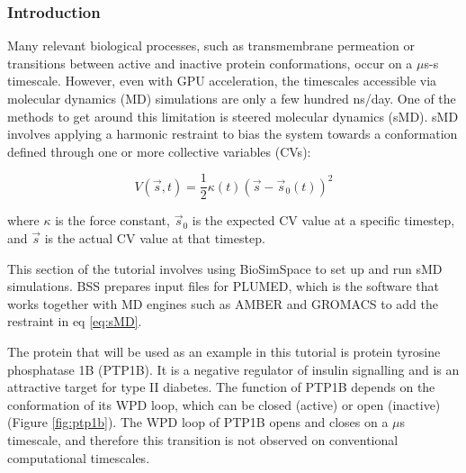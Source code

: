 \subsubsection{Introduction}
Many relevant biological processes, such as transmembrane permeation or transitions between active and inactive protein conformations, occur on a $\mu$s-s timescale\cite{Zwier2010,Choy2017,Wells2007}. However, even with GPU acceleration, the timescales accessible via molecular dynamics (MD) simulations are only a few hundred ns/day\cite{HecBioSim_benchmark}. One of the methods to get around this limitation is steered molecular dynamics (sMD). sMD involves applying a harmonic restraint to bias the system towards a conformation defined through one or more collective variables (CVs):

\begin{equation}
V(\vec{s},t) = \frac{1}{2} \kappa(t) ( \vec{s} - \vec{s}_0(t) )^2
\label{eq:sMD}
\end{equation}

where $\kappa$ is the force constant, $\vec{s}_0$ is the expected CV value at a specific timestep, and $\vec{s}$ is the actual CV value at that timestep\cite{Isralewitz2001,Tribello2014}.

This section of the tutorial involves using BioSimSpace to set up and run sMD simulations. BSS prepares input files for PLUMED, which is the software that works together with MD engines such as AMBER and GROMACS to add the restraint in eq \ref{eq:sMD}.

The protein that will be used as an example in this tutorial is protein tyrosine phosphatase 1B (PTP1B). It is a negative regulator of insulin signalling\cite{sMD_ptp1b-diabetes} and is an attractive target for type II diabetes\cite{sMD_Wiesman}. The function of PTP1B depends on the conformation of its WPD loop, which can be closed (active) or open (inactive) (Figure \ref{fig:ptp1b}). The WPD loop of PTP1B opens and closes on a $\mu$s timescale\cite{Choy2017}, and therefore this transition is not observed on conventional computational timescales.

